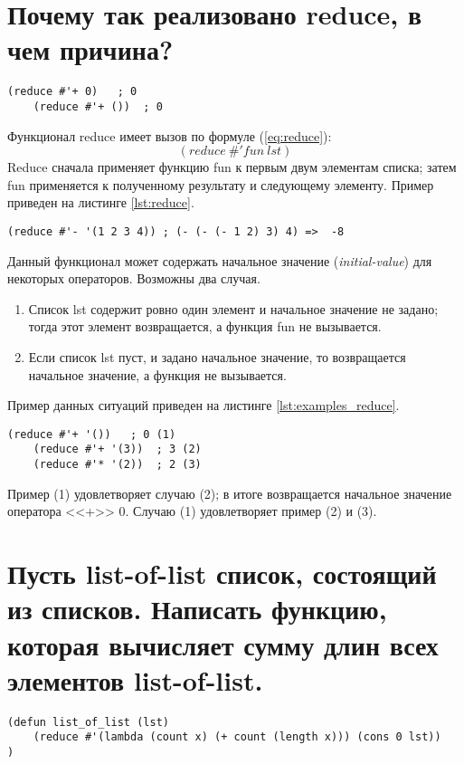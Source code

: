 \section{Почему так реализовано reduce, в чем причина?}
\begin{lstlisting}[basicstyle=\footnotesize, caption=Задание 8]
	(reduce #'+ 0)   ; 0
	(reduce #'+ ())  ; 0
\end{lstlisting}
Функционал reduce имеет вызов по формуле (\ref{eq:reduce}):
\begin{equation}
	\label{eq:reduce}
	(reduce\ \#'fun\ lst)
\end{equation}
Reduce сначала применяет функцию fun к первым двум элементам списка; затем fun применяется к полученному результату и следующему элементу. Пример приведен на листинге \ref{lst:reduce}.
\begin{lstlisting}[basicstyle=\footnotesize, label=lst:reduce]
	(reduce #'- '(1 2 3 4)) ; (- (- (- 1 2) 3) 4) =>  -8
\end{lstlisting}
Данный функционал может содержать начальное значение (\textit{initial-value}) для некоторых операторов. Возможны два случая.
\begin{enumerate}
	\item Список lst содержит ровно один элемент и начальное значение не задано; тогда этот элемент возвращается, а функция fun не вызывается.
	\item Если список lst пуст, и задано начальное значение, то возвращается начальное значение, а функция не вызывается.
\end{enumerate}

Пример данных ситуаций приведен на листинге \ref{lst:examples_reduce}.
\begin{lstlisting}[basicstyle=\footnotesize, label=lst:examples_reduce]
	(reduce #'+ '())   ; 0 (1)
	(reduce #'+ '(3))  ; 3 (2)
	(reduce #'* '(2))  ; 2 (3)
\end{lstlisting}
Пример (1) удовлетворяет случаю (2); в итоге возвращается начальное значение оператора <<+>> 0. Случаю (1) удовлетворяет пример (2) и (3). 

\section{Пусть list-of-list список, состоящий из списков. Написать функцию, которая вычисляет сумму длин всех элементов list-of-list.}
\begin{lstlisting}[basicstyle=\footnotesize, caption=Задание 9]
(defun list_of_list (lst)
	(reduce #'(lambda (count x) (+ count (length x))) (cons 0 lst))
)
\end{lstlisting}